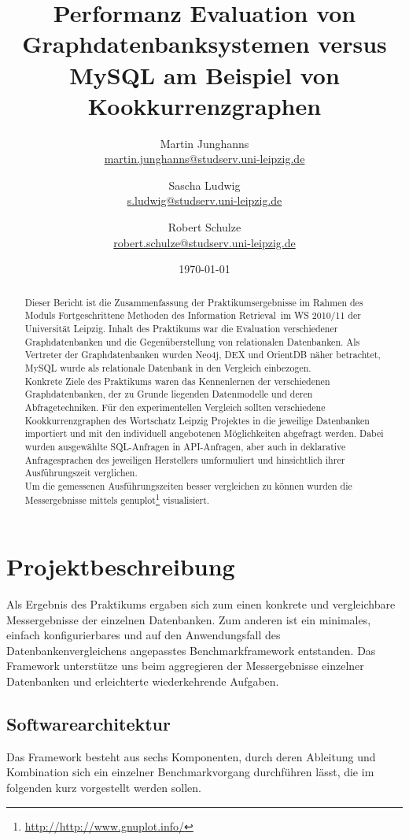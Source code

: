 \documentclass[11pt, a4paper, oneside]{article} %
\author{Martin Junghanns \\  \url{martin.junghanns@studserv.uni-leipzig.de} \and 
		Sascha Ludwig \\ \url{s.ludwig@studserv.uni-leipzig.de} \and 
		Robert Schulze \\ \url{robert.schulze@studserv.uni-leipzig.de} }
\date{\today}
\title{ Performanz Evaluation von Graphdatenbanksystemen versus MySQL am Beispiel von Kookkurrenzgraphen }
\begin{document}
\renewcommand{\labelitemi}{-}

\maketitle

\begin{abstract}
	Dieser Bericht ist die Zusammenfassung der Praktikumsergebnisse im Rahmen des Moduls \dq Fortgeschrittene Methoden des Information Retrieval\dq~im WS 2010/11 der Universität Leipzig. Inhalt des Praktikums war die Evaluation verschiedener Graphdatenbanken und die Gegenüberstellung von relationalen Datenbanken. Als Vertreter der Graphdatenbanken wurden Neo4j, DEX und OrientDB näher betrachtet, MySQL wurde als relationale Datenbank in den Vergleich einbezogen.\\
Konkrete Ziele des Praktikums waren das Kennenlernen der verschiedenen Graphdatenbanken, der zu Grunde liegenden Datenmodelle und deren Abfragetechniken. Für den experimentellen Vergleich sollten verschiedene Kookkurrenzgraphen des Wortschatz Leipzig Projektes in die jeweilige Datenbanken importiert und mit den individuell angebotenen Möglichkeiten abgefragt werden. Dabei wurden ausgewählte SQL-Anfragen in API-Anfragen, aber auch in deklarative Anfragesprachen des jeweiligen Herstellers umformuliert und hinsichtlich ihrer Ausführungszeit verglichen.\\
Um die gemessenen Ausführungszeiten besser vergleichen zu können wurden die Messergebnisse mittels genuplot\footnote{\url{http://http://www.gnuplot.info/}} visualisiert.
\end{abstract}

\listoftodos

\section{Projektbeschreibung}
	Als Ergebnis des Praktikums ergaben sich zum einen konkrete und vergleichbare Messergebnisse der einzelnen Datenbanken. Zum anderen ist ein minimales, einfach konfigurierbares und auf den Anwendungsfall des Datenbankenvergleichens angepasstes Benchmarkframework entstanden. Das Framework unterstütze uns beim aggregieren der Messergebnisse einzelner Datenbanken und erleichterte wiederkehrende Aufgaben. 
	
\subsection{Softwarearchitektur}
Das Framework besteht aus sechs Komponenten, durch deren Ableitung und Kombination sich ein einzelner Benchmarkvorgang durchführen lässt, die im folgenden kurz vorgestellt werden sollen. 
\end{document}
